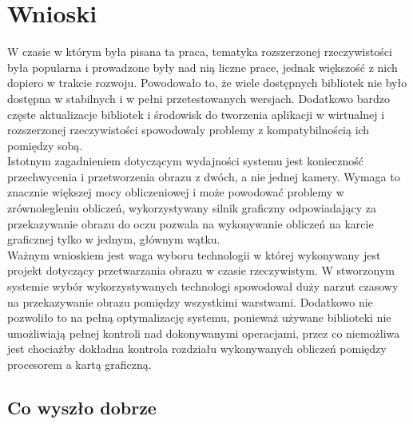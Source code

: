 \documentclass[a4paper,11pt,twoside]{report}
\theoremstyle{definition}
\begin{document}
\section{Wnioski}

W czasie w którym była pisana ta praca, tematyka rozszerzonej rzeczywistości była popularna i prowadzone były nad nią liczne prace, jednak większość z nich dopiero w trakcie rozwoju. Powodowało to, że wiele dostępnych bibliotek nie było dostępna w stabilnych i w pełni przetestowanych wersjach. Dodatkowo bardzo częste aktualizacje bibliotek i środowisk do tworzenia aplikacji w wirtualnej i rozszerzonej rzeczywistości spowodowaly problemy z kompatybilnością ich pomiędzy sobą. \\
Istotnym zagadnieniem dotyczącym wydajności systemu jest konieczność przechwycenia i przetworzenia obrazu z dwóch, a nie jednej kamery. Wymaga to znacznie większej mocy obliczeniowej i może powodować  problemy w zrównolegleniu obliczeń, wykorzystywany silnik graficzny odpowiadający za przekazywanie obrazu do oczu pozwala na wykonywanie obliczeń na karcie graficznej tylko w jednym, głównym wątku. \\
Ważnym wnioskiem jest waga wyboru technologii w której wykonywany jest projekt dotyczący  przetwarzania obrazu w czasie rzeczywistym. W stworzonym systemie wybór wykorzystywanych technologi  spowodował duży narzut czasowy na przekazywanie obrazu pomiędzy wszystkimi warstwami. Dodatkowo nie pozwoliło to na pełną optymalizację systemu, ponieważ używane biblioteki nie umożliwiają pełnej kontroli nad dokonywanymi operacjami, przez co niemożliwa jest chociażby dokładna kontrola rozdziału wykonywanych obliczeń pomiędzy procesorem a kartą graficzną.


\subsection{Co wyszło dobrze}
\end{document}
